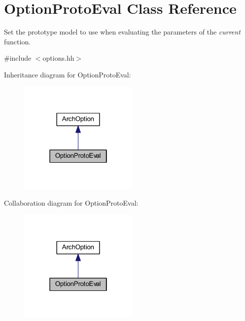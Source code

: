 \hypertarget{class_option_proto_eval}{}\section{Option\+Proto\+Eval Class Reference}
\label{class_option_proto_eval}


Set the prototype model to use when evaluating the parameters of the {\itshape current} function.  




{\ttfamily \#include $<$options.\+hh$>$}



Inheritance diagram for Option\+Proto\+Eval\+:
\nopagebreak
\begin{figure}[H]
\begin{center}
\leavevmode
\includegraphics[width=166pt]{class_option_proto_eval__inherit__graph}
\end{center}
\end{figure}


Collaboration diagram for Option\+Proto\+Eval\+:
\nopagebreak
\begin{figure}[H]
\begin{center}
\leavevmode
\includegraphics[width=166pt]{class_option_proto_eval__coll__graph}
\end{center}
\end{figure}
